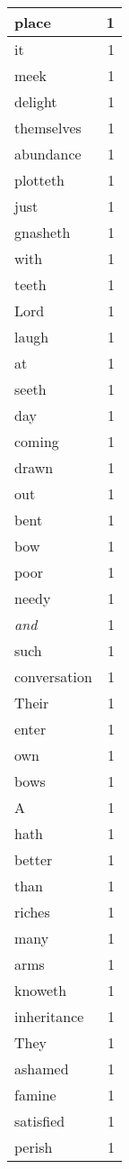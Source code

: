 \begin{center}
\begin{longtable}{l|r}
place & 1 \\ \hline
it & 1 \\ \hline
meek & 1 \\ \hline
delight & 1 \\ \hline
themselves & 1 \\ \hline
abundance & 1 \\ \hline
plotteth & 1 \\ \hline
just & 1 \\ \hline
gnasheth & 1 \\ \hline
with & 1 \\ \hline
teeth & 1 \\ \hline
Lord & 1 \\ \hline
laugh & 1 \\ \hline
at & 1 \\ \hline
seeth & 1 \\ \hline
day & 1 \\ \hline
coming & 1 \\ \hline
drawn & 1 \\ \hline
out & 1 \\ \hline
bent & 1 \\ \hline
bow & 1 \\ \hline
poor & 1 \\ \hline
needy & 1 \\ \hline
\emph{and} & 1 \\ \hline
such & 1 \\ \hline
conversation & 1 \\ \hline
Their & 1 \\ \hline
enter & 1 \\ \hline
own & 1 \\ \hline
bows & 1 \\ \hline
A & 1 \\ \hline
hath & 1 \\ \hline
better & 1 \\ \hline
than & 1 \\ \hline
riches & 1 \\ \hline
many & 1 \\ \hline
arms & 1 \\ \hline
knoweth & 1 \\ \hline
inheritance & 1 \\ \hline
They & 1 \\ \hline
ashamed & 1 \\ \hline
famine & 1 \\ \hline
satisfied & 1 \\ \hline
perish & 1 \\ \hline

\end{longtable}
\end{center}
